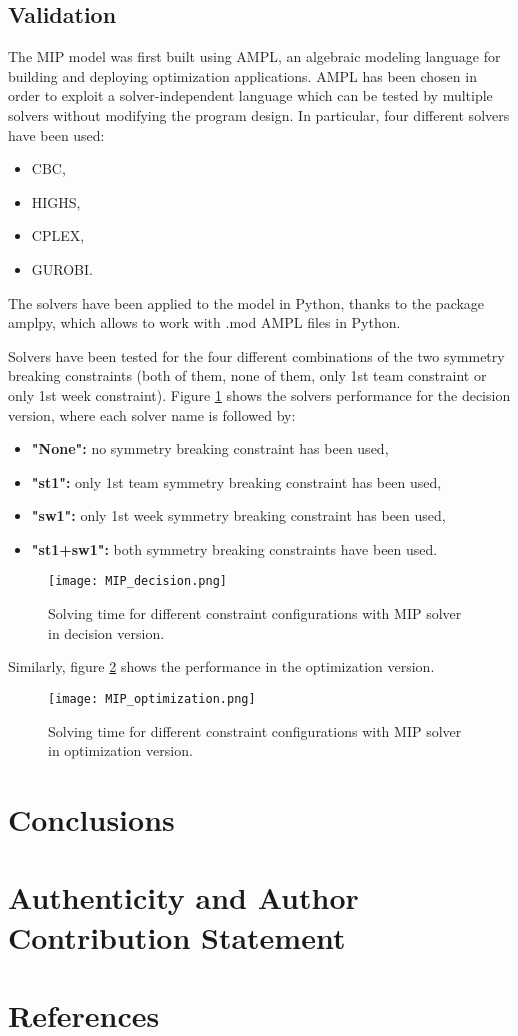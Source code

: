 \documentclass{article}
\begin{document}
\subsection{Validation}
The MIP model was first built using AMPL, an algebraic modeling language for building and deploying optimization applications. AMPL has been chosen in order to exploit a solver-independent language which can be tested by multiple solvers without modifying the program design. In particular, four different solvers have been used:

\begin{itemize}
    \item CBC,
    \item HIGHS,
    \item CPLEX, 
    \item GUROBI.
\end{itemize}

The solvers have been applied to the model in Python, thanks to the package amplpy, which allows to work with .mod AMPL files in Python.

Solvers have been tested for the four different combinations of the two symmetry breaking constraints (both of them, none of them, only 1st team constraint or only 1st week constraint). Figure \ref{fig:MIP_dec} shows the solvers performance for the decision version, where each solver name is followed by:

\begin{itemize}
    \item \textbf{"None":} no symmetry breaking constraint has been used,
    \item \textbf{"st1":} only 1st team symmetry breaking constraint has been used,
    \item \textbf{"sw1":} only 1st week symmetry breaking constraint has been used, 
    \item \textbf{"st1+sw1":} both symmetry breaking constraints have been used.
\end{itemize}

\begin{figure}[H]
    \centering
    \texttt{[image: MIP\_decision.png]}
    \caption{Solving time for different constraint configurations with MIP solver in decision version.}
    \label{fig:MIP_dec}
\end{figure}

Similarly, figure \ref{fig:MIP_opt} shows the performance in the optimization version.

\begin{figure}[H]
    \centering
    \texttt{[image: MIP\_optimization.png]}
    \caption{Solving time for different constraint configurations with MIP solver in optimization version.}
    \label{fig:MIP_opt}
\end{figure}

\section{Conclusions}

\section{Authenticity and Author Contribution Statement}

\section{References}
\end{document}
